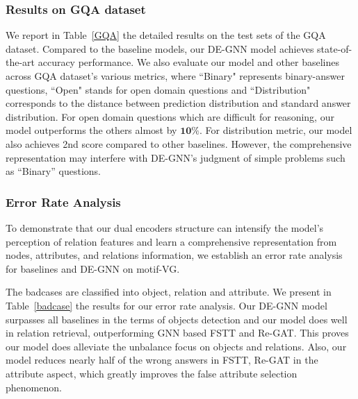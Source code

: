 \documentclass[letterpaper]{article} %
\begin{document}
\subsubsection{Results on GQA dataset} We report in Table~\ref{GQA} the detailed results on the test sets of the GQA dataset. Compared to the baseline models, our DE-GNN model achieves state-of-the-art accuracy performance. We also evaluate our model and other baselines across GQA dataset's various metrics, where ``Binary" represents binary-answer questions, ``Open" stands for open domain questions and ``Distribution" corresponds to the distance between prediction distribution and standard answer distribution. For open domain questions which are difficult for reasoning, our model outperforms the others almost by $\textbf{10\%}$. For distribution metric, our model also achieves 2nd score compared to other baselines. However, the comprehensive representation may interfere with DE-GNN's judgment of simple problems such as ``Binary'' questions.

\subsubsection{Error Rate Analysis} To demonstrate that our dual encoders structure can intensify the model's perception of relation features and learn a comprehensive representation from nodes, attributes, and relations information, we establish an error rate analysis for baselines and DE-GNN on motif-VG.

The badcases are classified into object, relation and attribute. We present in Table~\ref{badcase} the results for our error rate analysis. Our DE-GNN model surpasses all baselines in the terms of objects detection and our model does well in relation retrieval, outperforming GNN based FSTT and Re-GAT. This proves our model does alleviate the unbalance focus on objects and relations.
Also, our model reduces nearly half of the wrong answers in FSTT, Re-GAT in the attribute aspect, which greatly improves the false attribute selection phenomenon.
\end{document}
